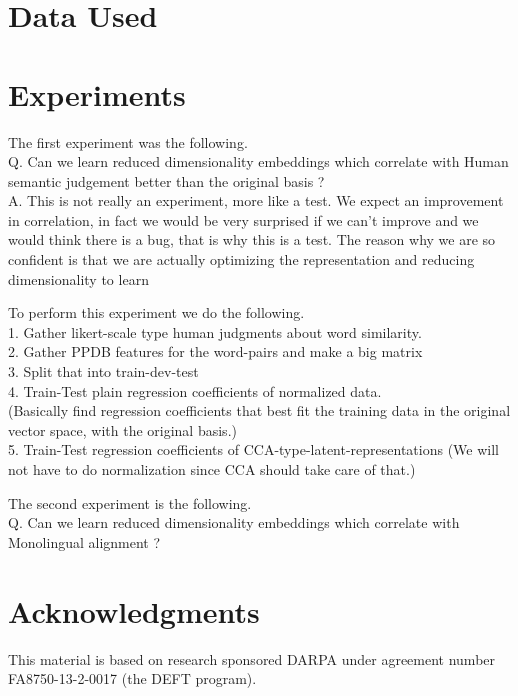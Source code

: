 \documentclass[11pt]{article}
\begin{document}
\section{Data Used}


\section{Experiments}
The first experiment was the following. \\
Q. Can we learn reduced dimensionality embeddings which correlate with
Human semantic judgement better than the original basis ? \\
A. This is not really an experiment, more like a test. We expect an
improvement in correlation, in fact we would be very 
surprised if we can't improve and we would think there is a bug, that
is why this is a test. The reason why we are so confident is that we are actually
optimizing the representation and reducing dimensionality to learn 

To perform this experiment we do the following.\\
1. Gather likert-scale type human judgments about word similarity.\\
2. Gather PPDB features for the word-pairs and make a big matrix \\
3. Split that into train-dev-test\\
4. Train-Test plain regression coefficients of normalized data. \\
   (Basically find regression coefficients that best fit the training
data in the original vector space, with the original basis.)\\
5. Train-Test regression coefficients of CCA-type-latent-representations (We will not have to do normalization since CCA should take care of that.)

The second experiment is the following. \\
Q. Can we learn reduced dimensionality embeddings which correlate with
Monolingual alignment ?  \\




\section*{Acknowledgments}
This material is based on research sponsored DARPA under agreement
number FA8750-13-2-0017 (the DEFT program).



\end{document}
